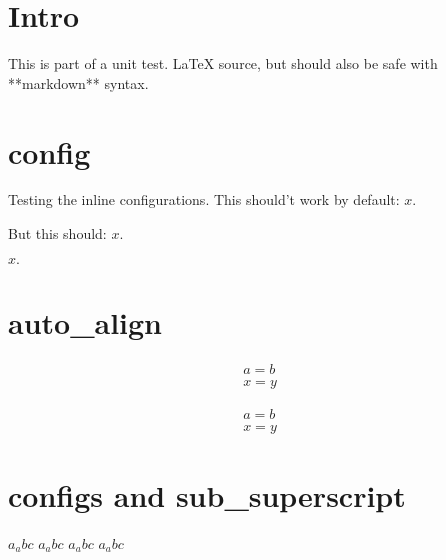 \documentclass[12pt]{article}
\begin{document}
\section{Intro}
This is part of a unit test. \LaTeX{} source, but should also be safe with **markdown** syntax.

\section{config}
Testing the inline configurations. This should't work by default: $x.$

But this should: $x.$

$x.$

\section{auto_align}

\begin {align}
a = b \\
x = y
\end{align}

\begin {align}
a = b \\
x = y
\end{align}

\section{configs and sub_superscript}
$a_ abc $
$a_ abc $
$a_abc$
$a_abc$

\end{document}
